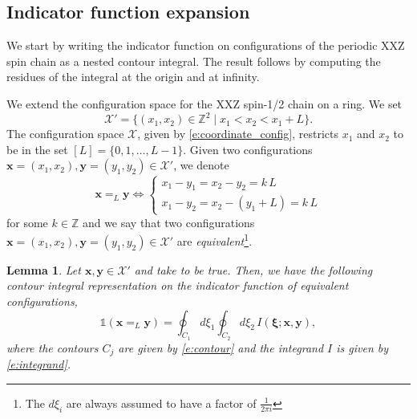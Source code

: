 \documentclass[a4paper,11pt]{article}
\newtheorem{lemma}[theorem]{Lemma}
\theoremstyle{definition}
\begin{document}
\subsection{Indicator function expansion}\label{sub:Indicator function expansion}

We start by writing the indicator function on configurations of the periodic XXZ spin chain as a nested contour integral. The result follows by computing the residues of the integral at the origin and at infinity.

We extend the configuration space for the XXZ spin-1/2 chain on a ring. We set
\begin{equation}
    \mathcal{X}' = \{(x_1, x_2) \in \mathbb{Z}^2 \mid x_1< x_2 < x_1+L\}.
\end{equation}
The configuration space $\mathcal{X}$, given by \eqref{e:coordinate_config}, restricts $x_1$ and $x_2$ to be in the set $[L]= \{0, 1, \dots, L-1\}$. Given two configurations $\boldsymbol{x} = (x_1, x_2), \boldsymbol{y}=(y_1, y_2) \in \mathcal{X}'$, we denote
\begin{equation}
    \boldsymbol{x}=_{L} \boldsymbol{y} \Leftrightarrow \begin{cases}
        x_1-y_1 = x_2-y_2=k\, L\\
        x_1-y_2 = x_2-(y_1+ L)= k\, L
    \end{cases}
\end{equation}
for some $k \in \mathbb{Z}$ and we say that two configurations $\boldsymbol{x} = (x_1, x_2), \boldsymbol{y}=(y_1, y_2) \in \mathcal{X}'$ are \emph{equivalent}\footnote{The $d\xi_i$ are always assumed to have a factor of $\frac{1}{2\pi i}$}.

\begin{lemma}\label{l:Indicator function expansion}
Let $\boldsymbol{x},\boldsymbol{y} \in \mathcal{X}'$ and take  to be true. Then, we have the following contour integral representation on the indicator function of equivalent configurations,
\begin{equation}\label{e:N=2ProofIndicator}
    \mathds{1}(\boldsymbol{x}=_{L} \boldsymbol{y}) = \oint_{C_1} d\xi_1 \oint_{C_2} d\xi_2 \, I(\boldsymbol{\xi};\mathbf{x},\mathbf{y}),
\end{equation}
where the contours $C_j$ are given by \eqref{e:contour} and the integrand $I$ is given by \eqref{e:integrand}.
\end{lemma}
\end{document}
